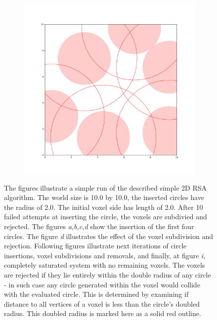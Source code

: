 \documentclass[12pt, oneside]{report}
\begin{document}
\begin{figure}
\begin{subfigure}[b]{0.3\linewidth}
    \caption{}
  \end{subfigure}
  \begin{subfigure}[b]{0.3\linewidth}
    \includegraphics[width=\linewidth]{Images/2dCircleRSA/fig9.pdf}
    \caption{}
  \end{subfigure}

  \caption{The figures illustrate a simple run of the described simple 2D RSA algorithm. \newline
		The world size is 10.0 by 10.0, the inserted circles have the radius of 2.0. The initial voxel side has length of 2.0. After 10 failed attempts at inserting the circle, the voxels are subdivied and rejected.\newline
		The figures \textit{a,b,c,d} show the insertion of the first four circles. The figure \textit{d} illustrates the effect of the voxel subdivision and rejection. Following figures illustrate next iterations of circle insertions, voxel subdivisions and removals, and finally, at figure \textit{i}, completely saturated system with no remaining voxels. \newline
		The voxels are rejected if they lie entirely within the double radius of any circle - in such case any circle generated within the voxel would collide with the evaluated circle. This is determined by examining if distance to all vertices of a voxel is less than the circle's doubled radius. This doubled radius is marked here as a solid red outline.}
  \label{VoxelCircleRSApdfExamples}
\end{figure}
\end{document}
